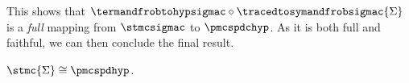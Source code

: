 This shows that \(
    \termandfrobtohypsigmac \circ \tracedtosymandfrobsigmac{\Sigma}
\) is a \emph{full} mapping from \(\stmcsigmac\) to \(\pmcspdchyp\).
As it is both full and faithful, we can then conclude the final result.

\begin{corollary}\label{cor:stmc-graph-iso}
    \(\stmc{\Sigma} \cong \pmcspdhyp\).
\end{corollary}